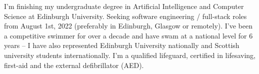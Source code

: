 

\begin{cvparagraph}
    I'm finishing my undergraduate degree in Artificial Intelligence and Computer Science at Edinburgh University. Seeking software engineering / full-stack roles from August 1st, 2022 (preferably in Edinburgh, Glasgow or remotely). I've been a competitive swimmer for over a decade and have swam at a national level for 6 years -- I have also represented Edinburgh University nationally and Scottish  university students internationally. I'm a qualified lifeguard, certified in lifesaving, first-aid and the external defibrillator (AED).
\end{cvparagraph}



